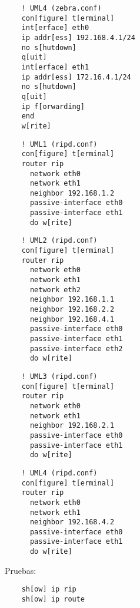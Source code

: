   \begin{verbatim}
    ! UML4 (zebra.conf)
    con[figure] t[erminal]
    int[erface] eth0
    ip addr[ess] 192.168.4.1/24
    no s[hutdown]
    q[uit]
    int[erface] eth1
    ip addr[ess] 172.16.4.1/24
    no s[hutdown]
    q[uit]
    ip f[orwarding]
    end
    w[rite]
  \end{verbatim}

  \begin{verbatim}
    ! UML1 (ripd.conf)
    con[figure] t[erminal]
    router rip
      network eth0
      network eth1
      neighbor 192.168.1.2
      passive-interface eth0
      passive-interface eth1
      do w[rite]
  \end{verbatim}

  \begin{verbatim}
    ! UML2 (ripd.conf)
    con[figure] t[erminal]
    router rip
      network eth0
      network eth1
      network eth2
      neighbor 192.168.1.1
      neighbor 192.168.2.2
      neighbor 192.168.4.1
      passive-interface eth0
      passive-interface eth1
      passive-interface eth2
      do w[rite]
  \end{verbatim}

  \begin{verbatim}
    ! UML3 (ripd.conf)
    con[figure] t[erminal]
    router rip
      network eth0
      network eth1
      neighbor 192.168.2.1
      passive-interface eth0
      passive-interface eth1
      do w[rite]
  \end{verbatim}

  \begin{verbatim}
    ! UML4 (ripd.conf)
    con[figure] t[erminal]
    router rip
      network eth0
      network eth1
      neighbor 192.168.4.2
      passive-interface eth0
      passive-interface eth1
      do w[rite]
  \end{verbatim}

  Pruebas:
  \begin{verbatim}
    sh[ow] ip rip
    sh[ow] ip route
  \end{verbatim}
